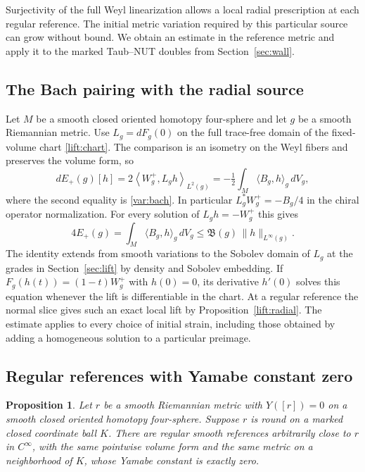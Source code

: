 \documentclass[11pt]{article}
\numberwithin{equation}{section}
\newtheorem{proposition}[theorem]{Proposition}
\theoremstyle{definition}
\theoremstyle{remark}
\begin{document}
Surjectivity of the full Weyl linearization allows a local radial
prescription at each regular reference. The initial metric variation
required by this particular source can grow without bound. We obtain
an estimate in the reference metric and apply it to the marked
Taub--NUT doubles from Section~\ref{sec:wall}.

\subsection{The Bach pairing with the radial source}

Let \(M\) be a smooth closed oriented homotopy four-sphere and let
\(g\) be a smooth Riemannian metric. Use \(L_g=dF_g(0)\) on the full
trace-free domain of the fixed-volume chart \eqref{lift:chart}.
The comparison is an isometry on the Weyl fibers and preserves the
volume form, so
\[
 dE_+(g)[h]
 =2\left\langle W_g^+,L_gh\right\rangle_{L^2(g)}
 =-\tfrac12\int_M\langle B_g,h\rangle_g\,dV_g ,
\]
where the second equality is \eqref{var:bach}. In particular
\(L_g^*W_g^+=-B_g/4\) in the chiral operator normalization.
For every solution of \(L_gh=-W_g^+\) this gives
\begin{equation}\label{mscost:strain}
  4E_+(g)=\int_M\langle B_g,h\rangle_g\,dV_g
     \le \mathfrak B(g)\,\|h\|_{L^\infty(g)} .
\end{equation}
The identity extends from smooth variations to the Sobolev domain
of \(L_g\) at the grades in Section~\ref{sec:lift} by density and
Sobolev embedding.
If \(F_g(h(t))=(1-t)W_g^+\) with \(h(0)=0\), its derivative
\(h'(0)\) solves this equation whenever the lift is differentiable
in the chart. At a regular reference the normal slice gives such
an exact local lift by Proposition~\ref{lift:radial}. The estimate
applies to every choice of initial strain, including those obtained
by adding a homogeneous solution to a particular preimage.

\subsection{Regular references with Yamabe constant zero}

\begin{proposition}\label{mscost:zero}
Let \(r\) be a smooth Riemannian metric with \(Y([r])=0\) on a smooth
closed oriented homotopy four-sphere. Suppose \(r\) is round on a
marked closed coordinate ball \(K\). There are regular smooth
references arbitrarily close to \(r\) in \(C^\infty\), with the same
pointwise volume form and the same metric on a neighborhood of
\(K\), whose Yamabe constant is exactly zero.
\end{proposition}
\end{document}
